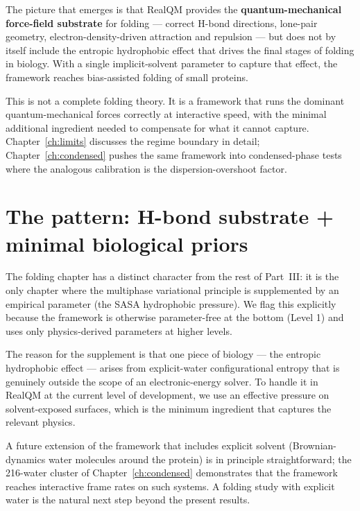 The picture that emerges is that RealQM provides the \textbf{quantum-mechanical force-field substrate} for folding --- correct H-bond directions, lone-pair geometry, electron-density-driven attraction and repulsion --- but does not by itself include the entropic hydrophobic effect that drives the final stages of folding in biology. With a single implicit-solvent parameter to capture that effect, the framework reaches bias-assisted folding of small proteins.

This is not a complete folding theory. It is a framework that runs the dominant quantum-mechanical forces correctly at interactive speed, with the minimal additional ingredient needed to compensate for what it cannot capture. Chapter~\ref{ch:limits} discusses the regime boundary in detail; Chapter~\ref{ch:condensed} pushes the same framework into condensed-phase tests where the analogous calibration is the dispersion-overshoot factor.

\section{The pattern: H-bond substrate + minimal biological priors}\label{sec:fold-pattern}

The folding chapter has a distinct character from the rest of Part~III: it is the only chapter where the multiphase variational principle is supplemented by an empirical parameter (the SASA hydrophobic pressure). We flag this explicitly because the framework is otherwise parameter-free at the bottom (Level 1) and uses only physics-derived parameters at higher levels.

The reason for the supplement is that one piece of biology --- the entropic hydrophobic effect --- arises from explicit-water configurational entropy that is genuinely outside the scope of an electronic-energy solver. To handle it in RealQM at the current level of development, we use an effective pressure on solvent-exposed surfaces, which is the minimum ingredient that captures the relevant physics.

A future extension of the framework that includes explicit solvent (Brownian-dynamics water molecules around the protein) is in principle straightforward; the 216-water cluster of Chapter~\ref{ch:condensed} demonstrates that the framework reaches interactive frame rates on such systems. A folding study with explicit water is the natural next step beyond the present results.


